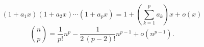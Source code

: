 \[
 (1 + a_1 x)(1 + a_2 x) \cdots (1 + a_p x) = 1 + \left(\sum_{k=1}^{p}a_k\right)x + o(x) 
\]
\[
 \binom{n}{p} = \frac{1}{p!} n^{p} - \frac{1}{2\,(p-2)!}n^{p-1} + o(n^{p-1}).
\]
